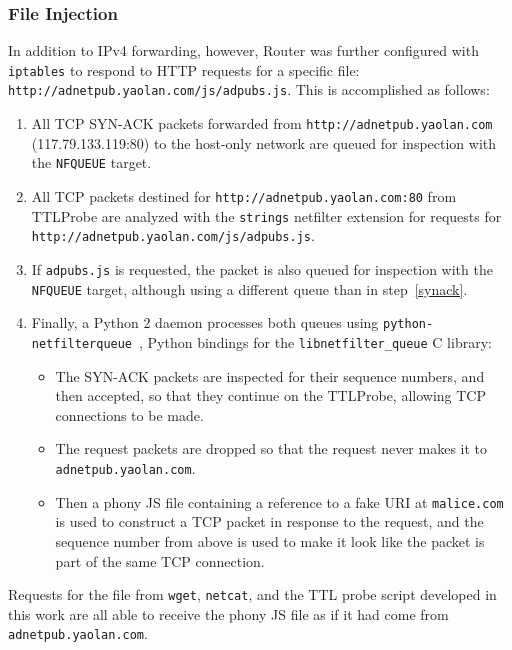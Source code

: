 \subsubsection{File Injection}
In addition to IPv4 forwarding, however, Router was further configured with \texttt{iptables} to respond to HTTP requests for a specific file: \texttt{http://adnetpub.yaolan.com/js/adpubs.js}.
This is accomplished as follows:
\begin{enumerate}\addtolength{\itemsep}{-.35\baselineskip}
	\item\label{synack} All TCP SYN-ACK packets forwarded from \texttt{http://adnetpub.yaolan.com} (117.79.133.119:80) to the host-only network are queued for inspection with the \texttt{NFQUEUE} target.
	\item All TCP packets destined for \texttt{http://adnetpub.yaolan.com:80} from TTLProbe are analyzed with the \texttt{strings} netfilter extension for requests for \texttt{http://adnetpub.yaolan.com/js/\allowbreak{}adpubs.js}.
	\item If \texttt{adpubs.js} is requested, the packet is also queued for inspection with the \texttt{NFQUEUE} target, although using a different queue than in step~\ref{synack}.
	\item Finally, a Python 2 daemon processes both queues using \texttt{python-netfilterqueue}~\cite{Kerkhoff2015}, Python bindings for the \texttt{libnetfilter\_queue} C library:
	\begin{itemize}
		\item The SYN-ACK packets are inspected for their sequence numbers, and then accepted, so that they continue on the TTLProbe, allowing TCP connections to be made.
		\item The request packets are dropped so that the request never makes it to \texttt{adnetpub.yaolan.com}.
		\item Then a phony JS file containing a reference to a fake URI at \texttt{malice.com} is used to construct a TCP packet in response to the request, and the sequence number from above is used to make it look like the packet is part of the same TCP connection.
	\end{itemize}
\end{enumerate}
Requests for the file from \texttt{wget}, \texttt{netcat}, and the TTL probe script developed in this work are all able to receive the phony JS file as if it had come from \texttt{adnetpub.yaolan.com}.
